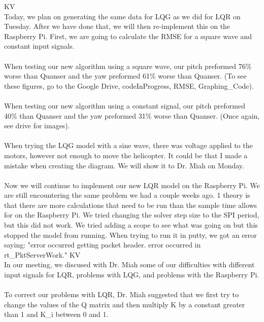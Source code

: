 \documentclass[fontsize=11pt, %
                             paper=letter, %
                             openany, %
                             captions=tableheading,
                             index=totoc,
                             hyperref]{labbook}
\begin{document}
\begin{addmargin}[0cm]{0cm}
KV\\
Today, we plan on generating the same data for LQG as we did for LQR on Tuesday.  After we have done that, we will then re-implement this on the Raspberry Pi.  First, we are going to calculate the RMSE for a square wave and constant input signals.\\
\\
When testing our new algorithm using a square wave, our pitch preformed 76\% worse than Quanser and the yaw preformed 61\% worse than Quanser.  (To see these figures, go to the Google Drive, codeInProgress, RMSE, Graphing\_Code).\\
\\
When testing our new algorithm using a constant signal, our pitch preformed 40\% than Quanser and the yaw preformed 31\% worse than Quanser.  (Once again, see drive for images).\\
\\
When trying the LQG model with a sine wave, there was voltage applied to the motors, however not enough to move the helicopter.  It could be that I made a mistake when creating the diagram.  We will show it to Dr. Miah on Monday.\\
\\
Now we will continue to implement our new LQR model on the Raspberry Pi.  We are still encountering the same problem we had a couple weeks ago.  1 theory is that there are more calculations that need to be run than the sample time allows for on the Raspberry Pi.  We tried changing the solver step size to the SPI period, but this did not work.  We tried adding a scope to see what was going on but this stopped the model from running.  When trying to run it in putty, we got an error saying: "error occurred getting packet header. error occurred in rt\_PktServerWork."
KV\\
In our meeting, we discused with Dr. Miah some of our difficulties with different input signals for LQR, problems with LQG, and problems with the Raspberry Pi.\\
\\
To correct our problems with LQR, Dr. Miah suggested that we first try to change the values of the Q matrix and then multiply K by a constant greater than 1 and K\_i between 0 and 1.\\

\end{addmargin}
\end{document}
